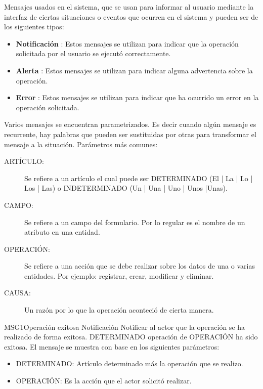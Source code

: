 \noindent
Mensajes usados en el sistema, que se usan para informar al usuario mediante la interfaz de ciertas situaciones o eventos que ocurren en el sistema y pueden ser de los siguientes tipos: \\
\begin{itemize}	
	\item \textbf{Notificación} : Estos mensajes se utilizan para indicar que la operación solicitada por el usuario se ejecutó correctamente.
	\item \textbf{Alerta} : Estos mensajes se utilizan para indicar alguna advertencia sobre la operación.
	\item \textbf{Error} : Estos mensajes se utilizan para indicar que ha ocurrido un error en la operación solicitada.
\end{itemize}	

\noindent
Varios mensajes se encuentran parametrizados. Es decir cuando algún mensaje es recurrente, hay palabras que pueden ser sustituidas por otras para transformar el mensaje a la situación. Parámetros más comunes: \\

\begin{description}
	\item[ARTÍCULO: ] Se refiere a un artículo el cual puede ser DETERMINADO (El | La | Lo | Los | Las) o INDETERMINADO (Un | Una | Uno | Unos |Unas).
	\item[CAMPO: ] Se refiere a un campo del formulario. Por lo regular es el nombre de un atributo en una entidad.
	\item[OPERACIÓN: ] Se refiere a una acción que se debe realizar sobre los datos de una o varias entidades. Por ejemplo: registrar, crear, modificar y eliminar.
	\item[CAUSA: ] Un razón por lo que la operación aconteció de cierta manera.
\end{description}


\begin{Message}{MSG1}{Operación exitosa} 
	\MSGitem[Tipo: ] Notificación
	\MSGitem[Objetivo: ] Notificar al actor que la operación se ha realizado de forma exitosa.
	\MSGitem[Redacción: ] DETERMINADO operación de OPERACIÓN ha sido exitosa.
	\MSGitem[Parámetros: ] El mensaje se muestra con base en los siguientes parámetros:
		\begin{itemize}	
			\item DETERMINADO: Artículo determinado más la operación que se realizo.
			\item OPERACIÓN: Es la acción que el actor solicitó realizar.
		\end{itemize}
\end{Message}

